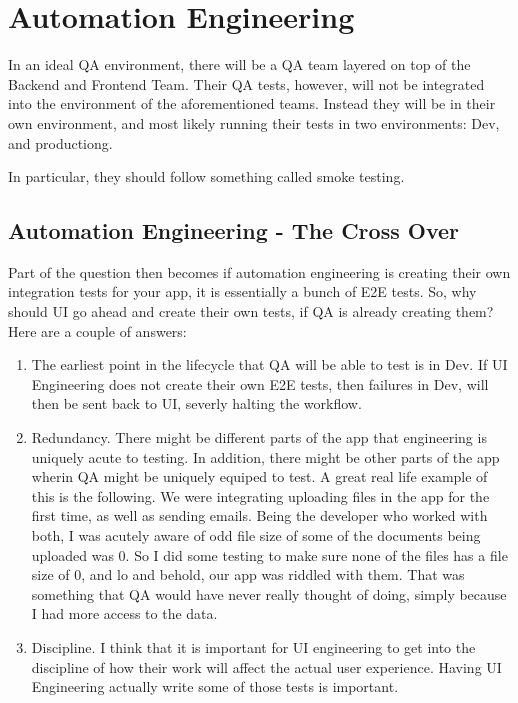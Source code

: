 
\chapter{ Automation Engineering }

In an ideal QA environment, there will be a QA team layered on top of the
Backend and Frontend Team. Their QA tests, however, will not be integrated into
the environment of the aforementioned teams. Instead they will be in their own
environment, and most likely running their tests in two environments: Dev, and
productiong.

In particular, they should follow something called smoke testing.


\section{ Automation Engineering - The Cross Over }
Part of the question then becomes if automation engineering is creating their
own integration tests for your app, it is essentially a bunch of E2E tests. So,
why should UI go ahead and create their own tests, if QA is already creating
them? Here are a couple of answers:
\begin{enumerate}
  \item The earliest point in the lifecycle that QA will be able to test is in
  Dev. If UI Engineering does not create their own E2E tests, then failures in
  Dev, will then be sent back to UI, severly halting the workflow.
  \item Redundancy. There might be different parts of the app that engineering
  is uniquely acute to testing. In addition, there might be other parts of the
  app wherin QA might be uniquely equiped to test. A great real life example of
  this is the following. We were integrating uploading files in the app for the
  first time, as well as sending emails. Being the developer who worked with
  both, I was acutely aware of odd file size of some of the documents being
  uploaded was 0. So I did some testing to make sure none of the files has a
  file size of 0, and lo and behold, our app was riddled with them. That was
  something that QA would have never really thought of doing, simply because I
  had more access to the data.
  \item Discipline. I think that it is important for UI engineering to get into
  the discipline of how their work will affect the actual user experience.
  Having UI Engineering actually write some of those tests is important.
\end{enumerate}

